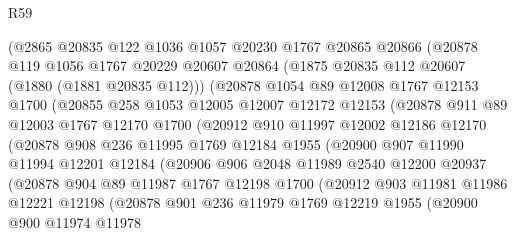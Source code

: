 \begin{lexlean}{R59}
\begin{coremodule}
          (@2865
            @20835
            @122
            @1036
            @1057
            @20230
            @1767
            @20865
            @20866
            (@20878
              @119
              @1056
              @1767
              @20229
              @20607
              @20864
              (@1875 @20835 @112 @20607 (@1880 (@1881 @20835 @112)))
              (@20878
                @1054
                @89
                @12008
                @1767
                @12153
                @1700
                (@20855
                  @258
                  @1053
                  @12005
                  @12007
                  @12172
                  @12153
                  (@20878
                    @911
                    @89
                    @12003
                    @1767
                    @12170
                    @1700
                    (@20912
                      @910
                      @11997
                      @12002
                      @12186
                      @12170
                      (@20878
                        @908
                        @236
                        @11995
                        @1769
                        @12184
                        @1955
                        (@20900
                          @907
                          @11990
                          @11994
                          @12201
                          @12184
                          (@20906
                            @906
                            @2048
                            @11989
                            @2540
                            @12200
                            @20937
                            (@20878
                              @904
                              @89
                              @11987
                              @1767
                              @12198
                              @1700
                              (@20912
                                @903
                                @11981
                                @11986
                                @12221
                                @12198
                                (@20878
                                  @901
                                  @236
                                  @11979
                                  @1769
                                  @12219
                                  @1955
                                  (@20900
                                    @900
                                    @11974
                                    @11978

\end{coremodule}
\end{lexlean}
